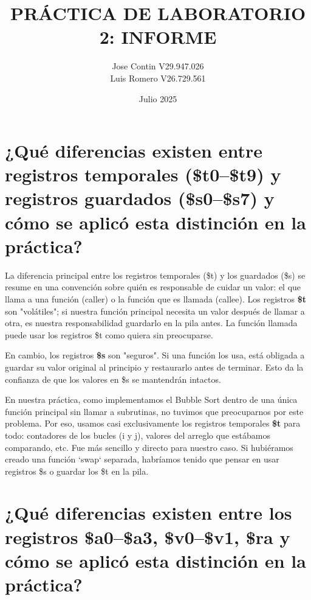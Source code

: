 \documentclass{article}
\title{PRÁCTICA DE LABORATORIO 2: INFORME}
\author{Jose Contin V29.947.026\\ Luis Romero V26.729.561}
\date{Julio 2025}
\begin{document}
\maketitle

\begingroup
\raggedright

\section{¿Qué diferencias existen entre registros temporales (\$t0–\$t9) y registros guardados (\$s0–\$s7) y cómo se aplicó esta distinción en la práctica?}

\indent\indent La diferencia principal entre los registros temporales (\$t) y los guardados (\$s) se resume en una convención sobre quién es responsable de cuidar un valor: el que llama a una función (caller) o la función que es llamada (callee). Los registros \textbf{\$t} son "volátiles"; si nuestra función principal necesita un valor después de llamar a otra, es nuestra responsabilidad guardarlo en la pila antes. La función llamada puede usar los registros \$t como quiera sin preocuparse.\newline

\noindent En cambio, los registros \textbf{\$s} son "seguros". Si una función los usa, está obligada a guardar su valor original al principio y restaurarlo antes de terminar. Esto da la confianza de que los valores en \$s se mantendrán intactos.\newline

\noindent En nuestra práctica, como implementamos el Bubble Sort dentro de una única función principal sin llamar a subrutinas, no tuvimos que preocuparnos por este problema. Por eso, usamos casi exclusivamente los registros temporales \textbf{\$t} para todo: contadores de los bucles (i y j), valores del arreglo que estábamos comparando, etc. Fue más sencillo y directo para nuestro caso. Si hubiéramos creado una función `swap` separada, habríamos tenido que pensar en usar registros \$s o guardar los \$t en la pila.

\section{¿Qué diferencias existen entre los registros \$a0–\$a3, \$v0–\$v1, \$ra y cómo se aplicó esta distinción en la práctica?}
\end{document}
